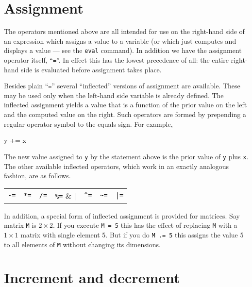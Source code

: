\section{Assignment}

The operators mentioned above are all intended for use on the
right-hand side of an expression which assigns a value to a variable
(or which just computes and displays a value --- see the \texttt{eval}
command). In addition we have the assignment operator itself,
``\texttt{=}''. In effect this has the lowest precedence of all: the
entire right-hand side is evaluated before assignment takes place.

Besides plain ``\texttt{=}'' several ``inflected'' versions of
assignment are available. These may be used only when the left-hand
side variable is already defined. The inflected assignment yields a
value that is a function of the prior value on the left and the
computed value on the right. Such operators are formed by prepending a
regular operator symbol to the equals sign. For example,
%
\begin{code}
y += x
\end{code}
%
The new value assigned to \texttt{y} by the statement above is the
prior value of \texttt{y} plus \texttt{x}. The other available
inflected operators, which work in an exactly analogous fashion, are
as follows.

\begin{center}
\begin{tabular}{ccccccc}
\texttt{-=} & \texttt{*=} & \texttt{/=} & \verb|%=| & 
  \verb|^=| & \verb|~=| & \verb+|=+ \\
\end{tabular}
\end{center}

In addition, a special form of inflected assignment is provided for
matrices. Say matrix \texttt{M} is $2 \times 2$. If you execute
\texttt{M = 5} this has the effect of replacing \texttt{M} with a $1
\times 1$ matrix with single element 5. But if you do \texttt{M .= 5}
this assigns the value 5 to all elements of \texttt{M} without
changing its dimensions.

\section{Increment and decrement}

